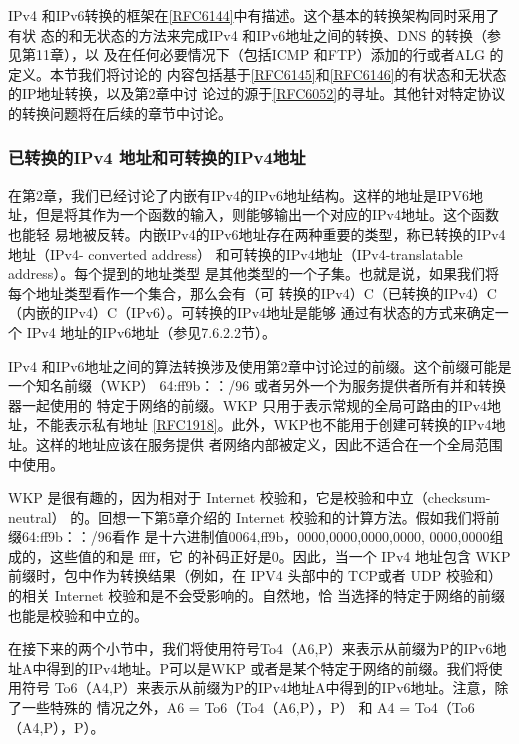 IPv4 和IPv6转换的框架在\href{https://www.rfc-editor.org/rfc/rfc6144}{[RFC6144]}中有描述。这个基本的转换架构同时采用了有状
态的和无状态的方法来完成IPv4 和IPv6地址之间的转换、DNS 的转换（参见第11章），以
及在任何必要情况下（包括ICMP 和FTP）添加的行或者ALG 的定义。本节我们将讨论的
内容包括基于\href{https://www.rfc-editor.org/rfc/rfc6145}{[RFC6145]}和\href{https://www.rfc-editor.org/rfc/rfc6146}{[RFC6146]}的有状态和无状态的IP地址转换，以及第2章中讨
论过的源于\href{https://www.rfc-editor.org/rfc/rfc6052}{[RFC6052]}的寻址。其他针对特定协议的转换问题将在后续的章节中讨论。

\subsubsection{已转换的IPv4 地址和可转换的IPv4地址}

在第2章，我们已经讨论了内嵌有IPv4的IPv6地址结构。这样的地址是IPV6地
址，但是将其作为一个函数的输入，则能够输出一个对应的IPv4地址。这个函数也能轻
易地被反转。内嵌IPv4的IPv6地址存在两种重要的类型，称已转换的IPv4地址（IPv4-
converted address） 和可转换的IPv4地址（IPv4-translatable address）。每个提到的地址类型
是其他类型的一个子集。也就是说，如果我们将每个地址类型看作一个集合，那么会有（可
转换的IPv4）C（已转换的IPv4）C（内嵌的IPv4）C（IPv6）。可转换的IPv4地址是能够
通过有状态的方式来确定一个 IPv4 地址的IPv6地址（参见7.6.2.2节）。

IPv4 和IPv6地址之间的算法转换涉及使用第2章中讨论过的前缀。这个前缀可能是
一个知名前缀（WKP） 64:ff9b：：/96 或者另外一个为服务提供者所有并和转换器一起使用的
特定于网络的前缀。WKP 只用于表示常规的全局可路由的IPv4地址，不能表示私有地址
\href{https://www.rfc-editor.org/rfc/rfc1918}{[RFC1918]}。此外，WKP也不能用于创建可转换的IPv4地址。这样的地址应该在服务提供
者网络内部被定义，因此不适合在一个全局范围中使用。

WKP 是很有趣的，因为相对于 Internet 校验和，它是校验和中立（checksum-neutral）
的。回想一下第5章介绍的 Internet 校验和的计算方法。假如我们将前缀64:ff9b：：/96看作
是十六进制值0064,ff9b，0000,0000,0000,0000, 0000,0000组成的，这些值的和是 ffff，它
的补码正好是0。因此，当一个 IPv4 地址包含 WKP 前缀时，包中作为转换结果（例如，在
IPV4 头部中的 TCP或者 UDP 校验和）的相关 Internet 校验和是不会受影响的。自然地，恰
当选择的特定于网络的前缀也能是校验和中立的。

在接下来的两个小节中，我们将使用符号To4（A6,P）来表示从前缀为P的IPv6地
址A中得到的IPv4地址。P可以是WKP 或者是某个特定于网络的前缀。我们将使用符号
To6（A4,P）来表示从前缀为P的IPv4地址A中得到的IPv6地址。注意，除了一些特殊的
情况之外，A6 = To6（To4（A6,P），P） 和 A4 = To4（To6（A4,P），P）。


